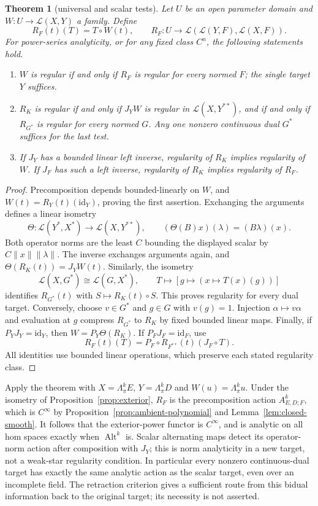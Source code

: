 \documentclass[11pt]{amsart}
\newtheorem{theorem}{Theorem}[section]
\theoremstyle{definition}
\theoremstyle{remark}
\numberwithin{equation}{section}
\newcommand{\cL}{\mathcal L}
\newcommand{\Alt}{\operatorname{Alt}}
\newcommand{\id}{\mathrm{id}}
\newcommand{\norm}[1]{\lVert #1\rVert}
\begin{document}
\begin{theorem}[universal and scalar tests]\label{thm:duality}
Let $U$ be an open parameter domain and $W\colon U\to\cL(X,Y)$ a family. Define
\[
 R_F(t)(T)=T\circ W(t),\qquad
 R_F\colon U\to\cL(\cL(Y,F),\cL(X,F)).
\]
For power-series analyticity, or for any fixed class $C^n$, the following statements hold.
\begin{enumerate}
\item $W$ is regular if and only if $R_F$ is regular for every normed $F$; the single target $Y$ suffices.
\item $R_K$ is regular if and only if $J_YW$ is regular in $\cL(X,Y^{**})$, and if and only if
$R_{G^*}$ is regular for every normed $G$. Any one nonzero continuous dual $G^*$ suffices for the last test.
\item If $J_Y$ has a bounded linear left inverse, regularity of $R_K$ implies regularity of $W$.
If $J_F$ has such a left inverse, regularity of $R_K$ implies regularity of $R_F$.
\end{enumerate}
\end{theorem}
\begin{proof}
Precomposition depends bounded-linearly on $W$, and $W(t)=R_Y(t)(\id_Y)$, proving the first assertion.
Exchanging the arguments defines a linear isometry
\[
 \Theta\colon\cL(Y^*,X^*)\longrightarrow\cL(X,Y^{**}),
 \qquad (\Theta(B)x)(\lambda)=(B\lambda)(x).
\]
Both operator norms are the least $C$ bounding the displayed scalar by $C\norm x\norm\lambda$.
The inverse exchanges arguments again, and $\Theta(R_K(t))=J_YW(t)$.
Similarly, the isometry
\[
 \cL(X,G^*)\cong\cL(G,X^*),\qquad T\longmapsto[g\mapsto(x\mapsto T(x)(g))]
\]
identifies $R_{G^*}(t)$ with $S\mapsto R_K(t)\circ S$. This proves regularity for every dual target.
Conversely, choose $v\in G^*$ and $g\in G$ with $v(g)=1$. Injection $\alpha\mapsto v\alpha$ and
evaluation at $g$ compress $R_{G^*}$ to $R_K$ by fixed bounded linear maps.
Finally, if $P_YJ_Y=\id_Y$, then $W=P_Y\Theta(R_K)$. If $P_FJ_F=\id_F$, use
\[
 R_F(t)(T)=P_F\circ R_{F^{**}}(t)(J_F\circ T).
\]
All identities use bounded linear operations, which preserve each stated regularity class.
\end{proof}

Apply the theorem with $X=\Lambda^k_\pi E$, $Y=\Lambda^k_\pi D$ and $W(u)=\Lambda^k_\pi u$. Under the isometry of Proposition~\ref{prop:exterior}, $R_F$ is the precomposition action $A^k_{E,D;F}$, which is $C^\infty$ by Proposition~\ref{prop:ambient-polynomial} and Lemma~\ref{lem:closed-smooth}.
It follows that the exterior-power functor is $C^\infty$, and is analytic on all hom spaces exactly
when $\Alt^k$ is. Scalar alternating maps detect its operator-norm action after composition with $J_Y$;
this is norm analyticity in a new target, not a weak-star regularity condition. In particular every
nonzero continuous-dual target has exactly the same analytic action as the scalar target, even over
an incomplete field. The retraction criterion gives a sufficient route from this bidual information
back to the original target; its necessity is not asserted.
\end{document}
